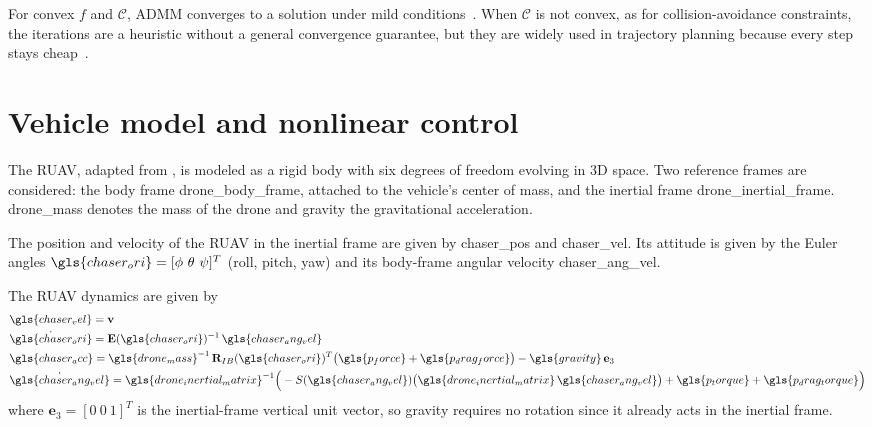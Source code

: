 For convex $f$ and $\mathcal{C}$, \gls{ADMM} converges to a solution under mild conditions~\cite{boydDistributedOptimizationStatistical2011}. When $\mathcal{C}$ is not convex, as for collision-avoidance constraints, the iterations are a heuristic without a general convergence guarantee, but they are widely used in trajectory planning because every step stays cheap~\cite{10161063}.

\section{Vehicle model and nonlinear control}
\label{sec.3:Vehicle model and noninear control}

The \gls{RUAV}, adapted from \cite{AlexandraGonalvesRodrigues2023}, is modeled as a
rigid body with six degrees of freedom evolving in \gls{3D} space. Two reference
frames are considered: the body frame \gls{drone_body_frame},
attached to the vehicle's center of mass, and the inertial frame
\gls{drone_inertial_frame}. \gls{drone_mass} denotes the mass
of the drone and \gls{gravity} the gravitational acceleration.

The position and velocity of the \gls{RUAV} in the inertial frame are given by
\gls{chaser_pos} and \gls{chaser_vel}. Its attitude is given by the Euler angles
$\gls{chaser_ori} = [\phi\ \theta\ \psi]^T$ (roll, pitch, yaw) and its
body-frame angular velocity \gls{chaser_ang_vel}.

The \gls{RUAV} dynamics are given by
\begin{equation}
    \begin{aligned}
        &\gls{chaser_vel} = \mathbf{v} \\
        &\dot{\gls{chaser_ori}} = \mathbf{E}(\gls{chaser_ori})^{-1}\, \gls{chaser_ang_vel} \\
        &\gls{chaser_acc} = \gls{drone_mass}^{-1}\, \mathbf{R}_{IB}(\gls{chaser_ori})^{T}
            \big(\gls{p_force} + \gls{p_drag_force}\big) - \gls{gravity}\, \mathbf{e}_3 \\
        &\dot{\gls{chaser_ang_vel}} = \gls{drone_inertial_matrix}^{-1}
            \Big(-S(\gls{chaser_ang_vel}) \big(\gls{drone_inertial_matrix}\,
            \gls{chaser_ang_vel}\big) + \gls{p_torque} + \gls{p_drag_torque}\Big)
    \end{aligned}
    \label{eq.3:ruav_dynamics}
\end{equation}
where $\mathbf{e}_3 = [0\ 0\ 1]^T$ is the inertial-frame vertical unit vector, so gravity
requires no rotation since it already acts in the inertial frame.

